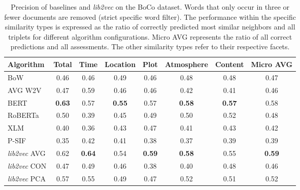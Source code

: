 \documentclass[11pt]{article}
\begin{document}
\begin{table}
	\centering
	\begin{tabular}{lccccccc}
		\toprule
		Algorithm          &     Total     &     Time      &   Location    &     Plot      &  Atmosphere   &    Content    &   Micro AVG   \\ \midrule
		BoW                &     0.46      &     0.46      &     0.49      &     0.46      &     0.48      &     0.48      &     0.47      \\
		AVG W2V            &     0.47      &     0.59      &     0.46      &     0.46      &     0.42      &     0.41      &     0.46      \\
		BERT               & \textbf{0.63} &     0.57      & \textbf{0.55} &     0.57      & \textbf{0.58} & \textbf{0.57} &     0.58      \\
		RoBERTa            &     0.50      &     0.39      &     0.45      &     0.49      &     0.50      &     0.52      &     0.48      \\
		XLM                &     0.40      &     0.36      &     0.43      &     0.47      &     0.41      &     0.43      &     0.42      \\
		P-SIF              &     0.35      &     0.42      &     0.41      &     0.38      &     0.37      &     0.39      &     0.39      \\
		\emph{lib2vec} AVG &     0.62      & \textbf{0.64} &     0.54      & \textbf{0.59} & \textbf{0.58} &     0.55      & \textbf{0.59} \\
		\emph{lib2vec} CON &     0.47      &     0.49      &     0.46      &     0.38      &     0.40      &     0.48      &     0.46      \\
		\emph{lib2vec} PCA &     0.57      &     0.55      &     0.49      &     0.47      &     0.52      &     0.51      &     0.52      \\ \bottomrule
	\end{tabular}
	\caption[Precision of Baselines and \emph{lib2vec} on {BoCo}]{Precision of baselines and \emph{lib2vec} on the {BoCo} dataset. 
		Words that only occur in three or fewer documents are removed (strict specific word filter).
		The performance within the specific similarity types is expressed as the ratio of correctly predicted most similar neighbors and all triplets for different algorithm configurations. Micro AVG represents the ratio of all correct predictions and all assessments.
		The other similarity types refer to their respective facets.}
	\label{tab:book_comparison_baselines_strict}
\end{table}
\end{document}
